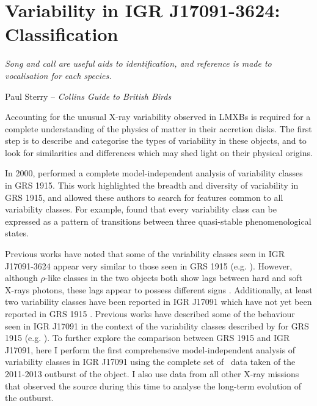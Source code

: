\chapter{Variability in IGR J17091-3624: Classification}

\label{ch:IGR}

\epigraph{\textit{Song and call are useful aids to identification, and reference is made to vocalisation for each species.}}{Paul Sterry -- \textit{Collins Guide to British Birds}}

\vspace{1cm}

\par\noindent Accounting for the unusual X-ray variability observed in LMXBs is required for a complete understanding of the physics of matter in their accretion disks.  The first step is to describe and categorise the types of variability in these objects, and to look for similarities and differences which may shed light on their physical origins.
\par In 2000, \citeauthor{Belloni_GRS_MI} performed a complete model-independent analysis of variability classes in GRS 1915.  This work highlighted the breadth and diversity of variability in GRS 1915, and allowed these authors to search for features common to all variability classes.  For example, \citet{Belloni_GRS_MI} found that every variability class can be expressed as a pattern of transitions between three quasi-stable phenomenological states.
\par Previous works have noted that some of the variability classes seen in IGR J17091-3624 appear very similar to those seen in GRS 1915 (e.g. \citealp{Altamirano_IGR_FH, Zhang_IGR}).  However, although $\rho$-like classes in the two objects both show lags between hard and soft X-rays photons, these lags appear to possess different signs \citep{Altamirano_IGR_FH}.  Additionally, at least two variability classes have been reported in IGR J17091 which have not yet been reported in GRS 1915 \citep{Pahari_IGRClasses}.  Previous works have described some of the behaviour seen in IGR J17091 in the context of the variability classes described by \citealt{Belloni_GRS_MI} for GRS 1915 (e.g. \citealp{Altamirano_IGR_FH,Pahari_RhoDiff}).  To further explore the comparison between GRS 1915 and IGR J17091, here I perform the first comprehensive model-independent analysis of variability classes in IGR J17091 using the complete set of \rxte\ data taken of the 2011-2013 outburst of the object.  I also use data from all other X-ray missions that observed the source during this time to analyse the long-term evolution of the outburst.

